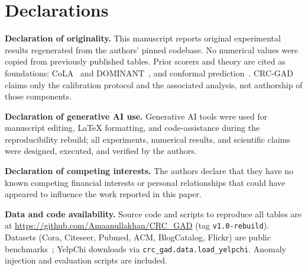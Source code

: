 \documentclass[a4paper]{cas-dc}
\theoremstyle{definition}
\begin{document}
\section*{Declarations}

\noindent\textbf{Declaration of originality.} This manuscript reports original experimental results regenerated from the authors' pinned codebase. No numerical values were copied from previously published tables. Prior scorers and theory are cited as foundations: CoLA~\cite{liu2022cola} and DOMINANT~\cite{ding2019dominant}, and conformal prediction~\cite{vovk2005algorithmic,bates2023testing}.
CRC-GAD claims only the calibration protocol and the associated analysis, not authorship of those components.

\noindent\textbf{Declaration of generative AI use.} Generative AI tools were used for manuscript editing, LaTeX formatting, and code-assistance during the reproducibility rebuild; all experiments, numerical results, and scientific claims were designed, executed, and verified by the authors.

\noindent\textbf{Declaration of competing interests.} The authors declare that they have no known competing financial interests or personal relationships that could have appeared to influence the work reported in this paper.

\noindent\textbf{Data and code availability.} Source code and scripts to reproduce all tables are at \url{https://github.com/Amaanullakhan/CRC_GAD} (tag \texttt{v1.0-rebuild}). Datasets (Cora, Citeseer, Pubmed, ACM, BlogCatalog, Flickr) are public benchmarks~\cite{ding2019dominant,liu2022cola}; YelpChi downloads via \texttt{crc\_gad.data.load\_yelpchi}. Anomaly injection and evaluation scripts are included.



\end{document}
